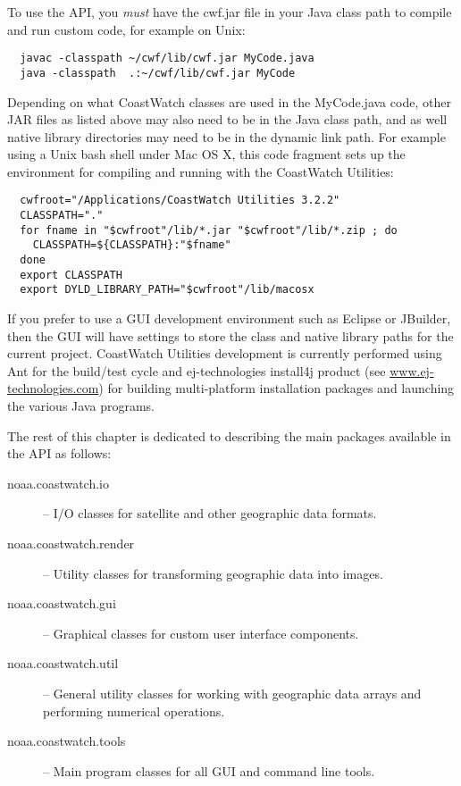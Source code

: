 {To use the API, you {\em must} have the {\file cwf.jar} file in
your Java class path to compile and run custom code, for example
on Unix:
\begin{verbatim}
  javac -classpath ~/cwf/lib/cwf.jar MyCode.java
  java -classpath  .:~/cwf/lib/cwf.jar MyCode
\end{verbatim}
Depending on what CoastWatch classes are used in the
{\file MyCode.java} code, other JAR files as listed above may also
need to be in the Java class path, and as well native library
directories may need to be in the dynamic link path.  For example
using a Unix bash shell under Mac OS X, this code fragment sets
up the environment for compiling and running with the CoastWatch
Utilities:
\begin{verbatim}
  cwfroot="/Applications/CoastWatch Utilities 3.2.2"
  CLASSPATH="."
  for fname in "$cwfroot"/lib/*.jar "$cwfroot"/lib/*.zip ; do 
    CLASSPATH=${CLASSPATH}:"$fname"
  done
  export CLASSPATH
  export DYLD_LIBRARY_PATH="$cwfroot"/lib/macosx
\end{verbatim}
If you prefer to use a GUI development environment such as
Eclipse or JBuilder, then the GUI will have settings to store the
class and native library paths for the current project.
CoastWatch Utilities development is currently performed using Ant
for the build/test cycle and ej-technologies install4j product
(see \url{www.ej-technologies.com}) for building multi-platform
installation packages and launching the various Java programs.

The rest of this chapter is dedicated to describing the main
packages available in the API as follows:
\begin{description}

\item[{\java noaa.coastwatch.io}] -- I/O classes for satellite and
other geographic data formats.

\item[{\java noaa.coastwatch.render}] -- Utility classes for
transforming geographic data into images.

\item[{\java noaa.coastwatch.gui}] -- Graphical classes for custom
user interface components.

\item[{\java noaa.coastwatch.util}] -- General utility classes for
working with geographic data arrays and performing numerical
operations.

\item[{\java noaa.coastwatch.tools}] -- Main program classes for
all GUI and command line tools.


\end{description}}

